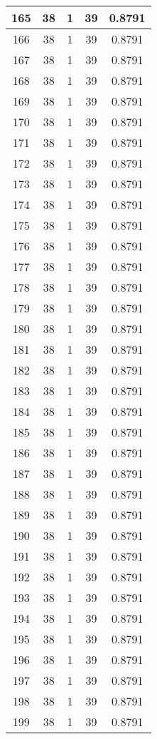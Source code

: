 \documentclass[letterpaper, 12pt]{article}
\begin{document}
\begin{longtable}{|c|c|c|c|c|}
\hline
165 & 38 & 1 & 39 & 0.8791 \\
\hline
166 & 38 & 1 & 39 & 0.8791 \\
\hline
167 & 38 & 1 & 39 & 0.8791 \\
\hline
168 & 38 & 1 & 39 & 0.8791 \\
\hline
169 & 38 & 1 & 39 & 0.8791 \\
\hline
170 & 38 & 1 & 39 & 0.8791 \\
\hline
171 & 38 & 1 & 39 & 0.8791 \\
\hline
172 & 38 & 1 & 39 & 0.8791 \\
\hline
173 & 38 & 1 & 39 & 0.8791 \\
\hline
174 & 38 & 1 & 39 & 0.8791 \\
\hline
175 & 38 & 1 & 39 & 0.8791 \\
\hline
176 & 38 & 1 & 39 & 0.8791 \\
\hline
177 & 38 & 1 & 39 & 0.8791 \\
\hline
178 & 38 & 1 & 39 & 0.8791 \\
\hline
179 & 38 & 1 & 39 & 0.8791 \\
\hline
180 & 38 & 1 & 39 & 0.8791 \\
\hline
181 & 38 & 1 & 39 & 0.8791 \\
\hline
182 & 38 & 1 & 39 & 0.8791 \\
\hline
183 & 38 & 1 & 39 & 0.8791 \\
\hline
184 & 38 & 1 & 39 & 0.8791 \\
\hline
185 & 38 & 1 & 39 & 0.8791 \\
\hline
186 & 38 & 1 & 39 & 0.8791 \\
\hline
187 & 38 & 1 & 39 & 0.8791 \\
\hline
188 & 38 & 1 & 39 & 0.8791 \\
\hline
189 & 38 & 1 & 39 & 0.8791 \\
\hline
190 & 38 & 1 & 39 & 0.8791 \\
\hline
191 & 38 & 1 & 39 & 0.8791 \\
\hline
192 & 38 & 1 & 39 & 0.8791 \\
\hline
193 & 38 & 1 & 39 & 0.8791 \\
\hline
194 & 38 & 1 & 39 & 0.8791 \\
\hline
195 & 38 & 1 & 39 & 0.8791 \\
\hline
196 & 38 & 1 & 39 & 0.8791 \\
\hline
197 & 38 & 1 & 39 & 0.8791 \\
\hline
198 & 38 & 1 & 39 & 0.8791 \\
\hline
199 & 38 & 1 & 39 & 0.8791 \\
\hline
\end{longtable}
\end{document}

